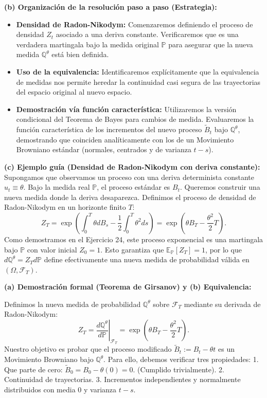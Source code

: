 \documentclass[11pt, letterpaper]{article}
\begin{document}
\begin{solucion}
    \textbf{(b) Organización de la resolución paso a paso (Estrategia):}
    \begin{itemize}
        \item[(i)] \textbf{Densidad de Radon-Nikodym:} Comenzaremos definiendo el proceso de densidad $Z_t$ asociado a una deriva constante. Verificaremos que es una verdadera martingala bajo la medida original $\mathbb{P}$ para asegurar que la nueva medida $\mathbb{Q}^\theta$ está bien definida.
        \item[(ii)] \textbf{Uso de la equivalencia:} Identificaremos explícitamente que la equivalencia de medidas nos permite heredar la continuidad casi segura de las trayectorias del espacio original al nuevo espacio.
        \item[(iii)] \textbf{Demostración vía función característica:} Utilizaremos la versión condicional del Teorema de Bayes para cambios de medida. Evaluaremos la función característica de los incrementos del nuevo proceso $\tilde{B}_t$ bajo $\mathbb{Q}^\theta$, demostrando que coinciden analíticamente con los de un Movimiento Browniano estándar (normales, centrados y de varianza $t-s$).
    \end{itemize}

    \vspace{3mm}
    \textbf{(c) Ejemplo guía (Densidad de Radon-Nikodym con deriva constante):}
    Supongamos que observamos un proceso con una deriva determinista constante $u_t \equiv \theta$. Bajo la medida real $\mathbb{P}$, el proceso estándar es $B_t$. Queremos construir una nueva medida donde la deriva desaparezca.
    Definimos el proceso de densidad de Radon-Nikodym en un horizonte finito $T$:
    \[ Z_T = \exp\left( \int_0^T \theta dB_s - \frac{1}{2} \int_0^T \theta^2 ds \right) = \exp\left( \theta B_T - \frac{\theta^2}{2} T \right). \]
    Como demostramos en el Ejercicio 24, este proceso exponencial es una martingala bajo $\mathbb{P}$ con valor inicial $Z_0 = 1$. Esto garantiza que $\mathbb{E}_{\mathbb{P}}[Z_T] = 1$, por lo que $d\mathbb{Q}^\theta = Z_T d\mathbb{P}$ define efectivamente una nueva medida de probabilidad válida en $(\Omega, \mathcal{F}_T)$.

    \vspace{3mm}
    \textbf{(a) Demostración formal (Teorema de Girsanov) y (b) Equivalencia:}

    Definimos la nueva medida de probabilidad $\mathbb{Q}^\theta$ sobre $\mathcal{F}_T$ mediante su derivada de Radon-Nikodym:
    \[ Z_T = \left.\frac{d\mathbb{Q}^\theta}{d\mathbb{P}}\right|_{\mathcal{F}_T} = \exp\left( \theta B_T - \frac{\theta^2}{2} T \right). \]
    Nuestro objetivo es probar que el proceso modificado $\tilde{B}_t := B_t - \theta t$ es un Movimiento Browniano bajo $\mathbb{Q}^\theta$. Para ello, debemos verificar tres propiedades:
    1. Que parte de cero: $\tilde{B}_0 = B_0 - \theta(0) = 0$. (Cumplido trivialmente).
    2. Continuidad de trayectorias.
    3. Incrementos independientes y normalmente distribuidos con media $0$ y varianza $t-s$.


\end{solucion}
\end{document}
